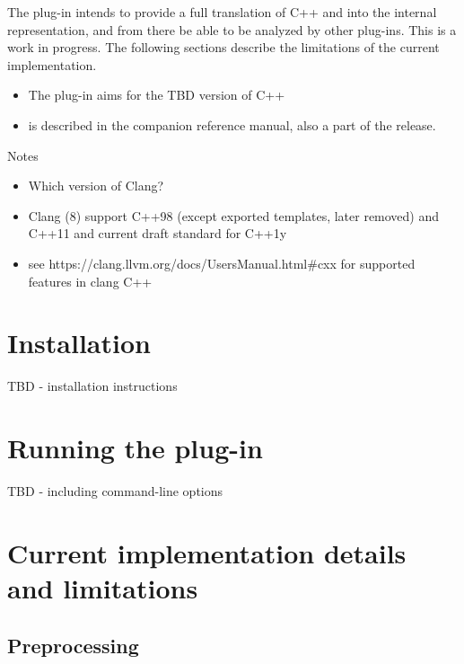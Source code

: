 The \fclang plug-in intends to provide a full translation of C++ and \acslpp into the \framac internal representation, and from there be able to be analyzed by other \framac plug-ins. This is a work in progress. The following sections describe the  limitations of the current implementation.
\begin{itemize}
	\item The plug-in aims for the TBD version of C++
	\item \acslpp is described in the companion \acslpp reference manual, also a part of the \framac release.
\end{itemize}


Notes
\begin{itemize}
	\item Which version of Clang?
	\item Clang (8) support C++98 (except exported templates, later removed) and C++11 and current draft standard for C++1y 
	\item see https://clang.llvm.org/docs/UsersManual.html\#cxx for supported features in clang C++
\end{itemize}

\chapter{Installation}

TBD - installation instructions

\chapter{Running the plug-in}

TBD - including command-line options

\chapter{Current implementation details and limitations}

\section{Preprocessing}

